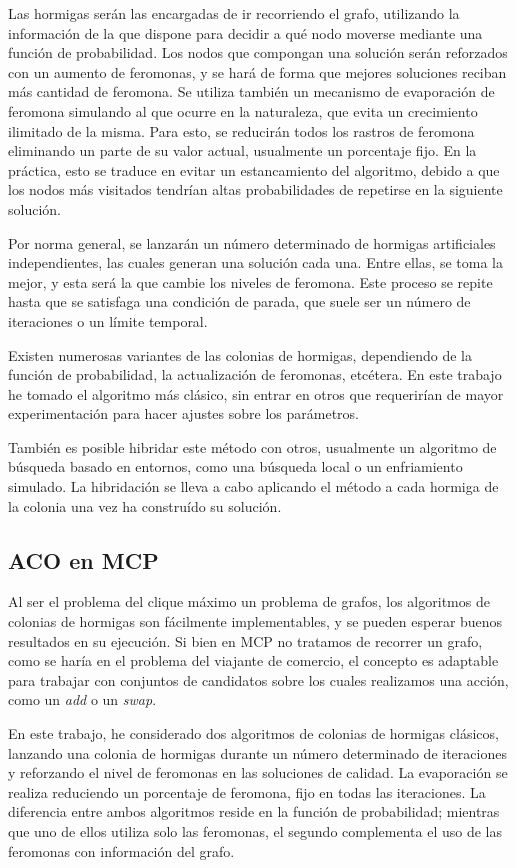 Las hormigas serán las encargadas de ir recorriendo el grafo, utilizando la información
de la que dispone para decidir a qué nodo moverse mediante una función de probabilidad.
Los nodos que compongan una solución serán reforzados con un aumento de feromonas, y
se hará de forma que mejores soluciones reciban más cantidad de feromona.
Se utiliza también un mecanismo de evaporación de feromona simulando al que ocurre en
la naturaleza, que evita un crecimiento ilimitado de la misma. Para esto, se reducirán
todos los rastros de feromona eliminando un parte de su valor actual, usualmente un
porcentaje fijo. En la práctica, esto se traduce en evitar un estancamiento del algoritmo,
debido a que los nodos más visitados tendrían altas probabilidades de repetirse en la
siguiente solución.

Por norma general, se lanzarán un número determinado de hormigas artificiales independientes,
las cuales generan una solución cada una. Entre ellas, se toma la mejor, y esta será la
que cambie los niveles de feromona. Este proceso se repite hasta que se satisfaga una
condición de parada, que suele ser un número de iteraciones o un límite temporal.

Existen numerosas variantes de las colonias de hormigas, dependiendo de la función de
probabilidad, la actualización de feromonas, etcétera. En este trabajo he tomado el
algoritmo más clásico, sin entrar en otros que requerirían de mayor experimentación
para hacer ajustes sobre los parámetros.

También es posible hibridar este método con otros, usualmente un algoritmo de búsqueda
basado en entornos, como una búsqueda local o un enfriamiento simulado. La hibridación
se lleva a cabo aplicando el método a cada hormiga de la colonia una vez ha construído su solución.

\subsection{ACO en MCP}

Al ser el problema del clique máximo un problema de grafos, los algoritmos de colonias
de hormigas son fácilmente implementables, y se pueden esperar buenos resultados en su
ejecución. Si bien en MCP no tratamos de recorrer un grafo, como se haría en el problema
del viajante de comercio, el concepto es adaptable para trabajar con conjuntos de candidatos
sobre los cuales realizamos una acción, como un \textit{add} o un \textit{swap}.

En este trabajo, he considerado dos algoritmos de colonias de hormigas clásicos,
lanzando una colonia de hormigas durante un número determinado de iteraciones y
reforzando el nivel de feromonas en las soluciones de calidad. La evaporación se
realiza reduciendo un porcentaje de feromona, fijo en todas las iteraciones.
La diferencia entre ambos algoritmos reside en la función de probabilidad;
mientras que uno de ellos utiliza solo las feromonas, el segundo complementa
el uso de las feromonas con información del grafo.

